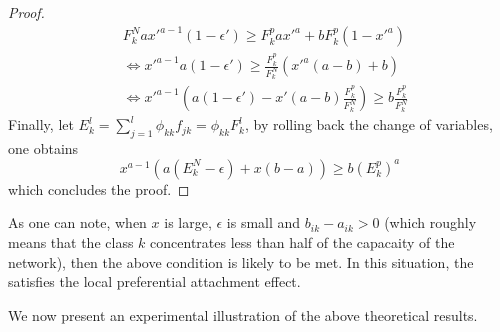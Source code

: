 \begin{proof}
\begin{align*}
&F_k^N a x'^{a-1} (1-\epsilon') \geq F_k^p a x'^a + b F_k^p (1-x'^a) \\
&\Leftrightarrow x'^{a-1} a(1-\epsilon') \geq \frac{F_k^p}{F_k^N} ( x'^a(a-b) + b) \\
&\Leftrightarrow x'^{a-1} \left(a(1-\epsilon') - x'(a-b)\frac{F_k^p}{F_k^N} \right) \geq b \frac{F_k^p}{F_k^N}
\end{align*}
Finally, let $E_k^l=\sum_{j=1}^l \phi_{kk}f_{jk}=\phi_{kk}F_k^l$, by rolling back the change of variables, one obtains
\begin{equation*}
x^{a-1}\left(a(E_k^N-\epsilon) +x(b-a) \right) \geq b (E_k^p)^a
\end{equation*}
which concludes the proof.


\end{proof}



As one can note, when $x$ is large, $\epsilon$ is small and $b_{ik}-a_{ik}>0$ (which roughly means that the class $k$ concentrates less than half of the capacaity of the network), then the above condition is likely to be met. In this situation, the \imb satisfies the local preferential attachment effect.

We now present an experimental illustration of the above theoretical results.



